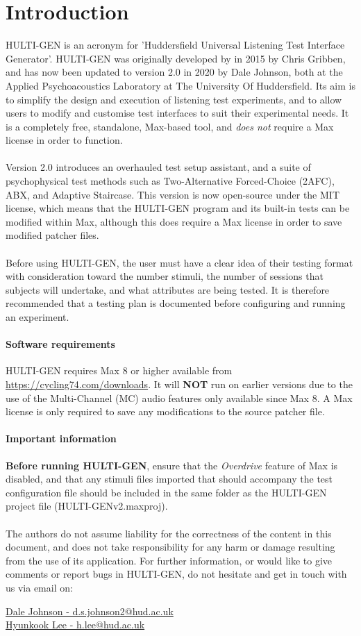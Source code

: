 \chapter{Introduction}
HULTI-GEN is an acronym for 'Huddersfield Universal Listening Test Interface Generator'. HULTI-GEN was originally developed by in 2015 by Chris Gribben, and has now been updated to version 2.0 in 2020 by Dale Johnson, both at the Applied Psychoacoustics Laboratory at The University Of Huddersfield. Its aim is to simplify the design and execution of listening test experiments, and to allow users to modify and customise test interfaces to suit their experimental needs. It is a completely free, standalone, Max-based tool, and \emph{does not} require a Max license in order to function. 
\\
\\
Version 2.0 introduces an overhauled test setup assistant, and a suite of psychophysical test methods such as Two-Alternative Forced-Choice (2AFC), ABX, and Adaptive Staircase. This version is now open-source under the MIT license, which means that the HULTI-GEN program and its built-in tests can be modified within Max, although this does require a Max license in order to save modified patcher files.
\\
\\
Before using HULTI-GEN, the user must have a clear idea of their testing format with consideration toward the number stimuli, the number of sessions that subjects will undertake, and what attributes are being tested. It is therefore recommended that a testing plan is documented before configuring and running an experiment.
\subsubsection{Software requirements}
HULTI-GEN requires Max 8 or higher available from \href{https://cycling74.com/downloads}{https://cycling74.com/downloads}. It will \textbf{NOT} run on earlier versions due to the use of the Multi-Channel (MC) audio features only available since Max 8. A Max license is only required to save any modifications to the source patcher file.
\subsubsection{Important information}
\textbf{Before running HULTI-GEN}, ensure that the \textit{Overdrive} feature of Max is disabled, and that any stimuli files imported that should accompany the test configuration file should be included in the same folder as the HULTI-GEN project file (HULTI-GENv2.maxproj).
\\
\\
The authors do not assume liability for the correctness of the content in this document, and does not take responsibility for any harm or damage resulting from the use of its application. For further information, or would like to give comments or report bugs in HULTI-GEN, do not hesitate and get in touch with us via email on:
\begin{center}
\href{mailto::d.s.johnson2@hud.ac.uk}{Dale Johnson - d.s.johnson2@hud.ac.uk}
\\
\href{mailto::h.lee@hud.ac.uk}{Hyunkook Lee - h.lee@hud.ac.uk}
\end{center}
